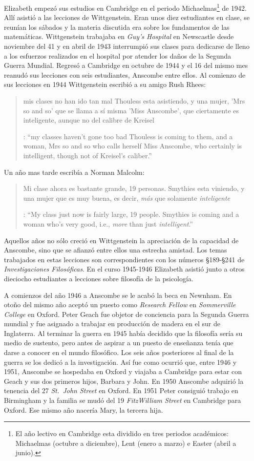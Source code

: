 Elizabeth empezó sus estudios en Cambridge en el periodo Michaelmas\footnote{El año lectivo en Cambridge esta dividido en tres periodos académicos: Michaelmas (octubre a diciembre), Lent (enero a marzo) e Easter (abril a junio).} de 1942. Allí asistió a las lecciones de Wittgenstein. Eran unos diez estudiantes en clase, se reunían los sábados y la materia discutida era sobre los fundamentos de las matemáticas. Wittgenstein trabajaba en \emph{Guy's Hospital} en Newscastle desde noviembre del 41 y en abril de 1943 interrumpió sus clases para dedicarse de lleno a los esfuerzos realizados en el hospital por atender los daños de la Segunda Guerra Mundial. Regresó a Cambridge en octubre de 1944 y el 16 del mismo mes reanudó sus lecciones con seis estudiantes, Anscombe entre ellos. Al comienzo de sus lecciones en 1944 Wittgenstein escribió a su amigo Rush Rhees: \blockquote[{\cite[371]{wittgenstein2012letters}}: \enquote{my classes haven't gone too bad \textelp{} Thouless is coming to them, and a woman, Mrs so and so who calls herself Miss Anscombe, who certainly is intelligent, though not of Kreisel's caliber.}]{mis clases no han ido tan mal \textelp{} Thouless esta asistiendo, y una mujer, 'Mrs so and so' que se llama a sí misma 'Miss Anscombe', que ciertamente es inteligente, aunque no del calibre de Kreisel}. Un año mas tarde escribía a Norman Malcolm: \blockquote[{\cite[388]{wittgenstein2012letters}}: \enquote{My class just now is fairly large, 19 people. \textelp{} Smythies is coming and a woman who's very good, i.e., \emph{more} than just \emph{intelligent}.}]{Mi clase ahora es bastante grande, 19 personas. \textelp{} Smythies esta viniendo, y una mujer que es muy buena, es decir, \emph{más} que solamente \emph{inteligente}}. Aquellos años no sólo creció en Wittgenstein la apreciación de la capacidad de Anscombe, sino que se afianzó entre ellos una estrecha amistad. Los temas trabajados en estas lecciones son correspondientes con los números \S189-\S241 de \emph{Investigaciones Filosóficas}. En el curso 1945-1946 Elizabeth asistió junto a otros dieciocho estudiantes a lecciones sobre filosofía de la psicología\autocite[Cf.~][354-356]{KlaggeNordman2003pubnpriv}.

A comienzos del año 1946 a Anscombe se le acabó la beca en Newnham. En otoño del mismo año aceptó un puesto como \emph{Research Fellow} en \emph{Sommerville College} en Oxford. Peter Geach fue objetor de conciencia para la Segunda Guerra mundial y fue asignado a trabajar en producción de madera en el sur de Inglaterra\autocite[Cf.~][34]{teichman2002fellows}. Al terminar la guerra en 1945 había decidido que la filosofía sería su medio de sustento, pero antes de aspirar a un puesto de enseñanza tenía que darse a conocer en el mundo filosófico\autocite[Cf.~][12]{geach1991philaut}. Los seis años posteriores al final de la guerra se los dedicó a la investigación. Así fue como ocurrió que, entre 1946 y 1951, Anscombe se hospedaba en Oxford y viajaba a Cambridge para estar con Geach y sus dos primeros hijos, Barbara y John. En 1950 Anscombe adquirió la tenencia del 27 \emph{St.~John Street} en Oxford. En 1951 Peter consiguió trabajo en Birmingham y la familia se mudó del 19 \emph{FitzWilliam Street} en Cambridge para Oxford\autocite[Cf.~][208]{NWR}. Ese mismo año nacería Mary, la tercera hija.


